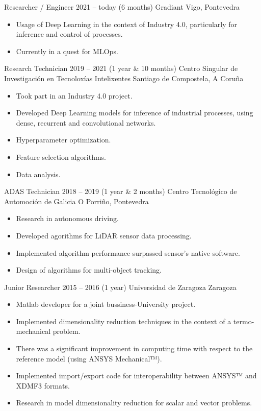 \cvitem
    {Researcher / Engineer}
    {2021 -- today (6 months)}
    {Gradiant}
    {Vigo, Pontevedra}
\begin{itemize}
  \small
  \item Usage of Deep Learning in the context of Industry 4.0, particularly for
    inference and control of processes.
  \item Currently in a quest for MLOps.
\end{itemize}

\cvitem
    {Research Technician}
    {2019 -- 2021 (1 year \& 10 months)}
    {Centro Singular de Investigación en Tecnoloxías Intelixentes}
    {Santiago de Compostela, A Coruña}
\begin{itemize}
    \small
    \item Took part in an Industry 4.0 project.
    \item Developed Deep Learning models for inference of industrial
      processes, using dense, recurrent and convolutional networks.
    \item Hyperparameter optimization.
    \item Feature selection algorithms.
    \item Data analysis.
\end{itemize}


\cvitem
    {ADAS Technician}
    {2018 -- 2019 (1 year \& 2 months)}
    {Centro Tecnológico de Automoción de Galicia}
    {O Porriño, Pontevedra}
\begin{itemize}
    \small
    \item Research in autonomous driving.
    \item Developed agorithms for LiDAR sensor data processing.
    \item Implemented algorithm performance surpassed sensor's native software.
    \item Design of algorithms for multi-object tracking.
\end{itemize}

\cvitem
    {Junior Researcher}
    {2015 -- 2016 (1 year)}
    {Universidad de Zaragoza}
    {Zaragoza}
\begin{itemize}
    \small
    \item Matlab developer for a joint bussiness-University project.
    \item Implemented dimensionality reduction techniques in the context of a
      termo-mechanical problem.
    \item There was a significant improvement in computing time with respect to the
      reference model (using ANSYS Mechanical™).
    \item Implemented import/export code for interoperability between ANSYS™ and
      XDMF3 formats.
    \item Research in model dimensionality reduction for scalar and vector problems.
\end{itemize}

